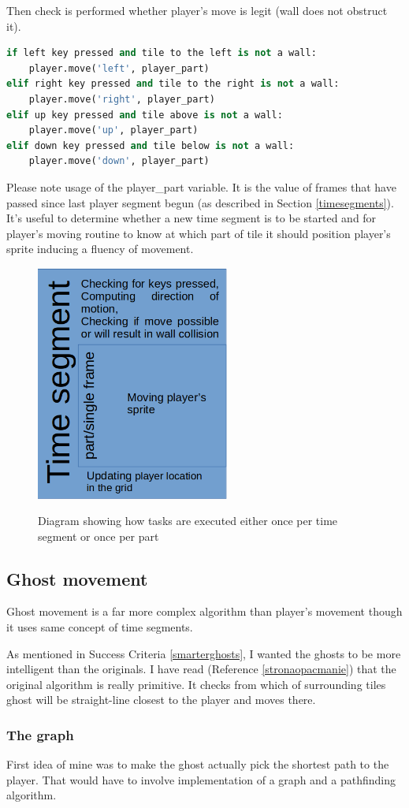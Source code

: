 \documentclass[11pt,a4paper]{report}
\newcommand{\dsubsection}[1]{\FloatBarrier \subsection{#1}}
\newenvironment{img}{
	\begin{center}
		\begin{figure}[H]
			\begin{center}
			
}{
	\end{center}
		\end{figure}
			\end{center}
}
\begin{document}
				Then check is performed whether player's move is legit (wall does not obstruct it).
				\begin{lstlisting}[language=Python]
if left key pressed and tile to the left is not a wall:
	player.move('left', player_part)
elif right key pressed and tile to the right is not a wall:
	player.move('right', player_part)
elif up key pressed and tile above is not a wall:
	player.move('up', player_part)
elif down key pressed and tile below is not a wall:
	player.move('down', player_part)
				\end{lstlisting}
				Please note usage of the player\_part variable. It is the value of frames that have passed since last player segment begun (as described in Section \ref{timesegments}). It's useful to determine whether a new time segment is to be started and for player's moving routine to know at which part of tile it should position player's sprite inducing a fluency of movement.
				\begin{img}
					\includegraphics[width=180pt]{images/movement-diagram}\\
					\caption{Diagram showing how tasks are executed either once per time segment or once per part}
					\label{player-TS}
				\end{img}
			\dsubsection{Ghost movement}
				Ghost movement is a far more complex algorithm than player's movement though it uses same concept of time segments.
				
				As mentioned in Success Criteria \ref{smarterghosts}, I wanted the ghosts to be more intelligent than the originals. I have read (Reference \ref{stronaopacmanie}) that the original algorithm is really primitive. It checks from which of surrounding tiles ghost will be straight-line closest to the player and moves there.
				\subsubsection{The graph}
					First idea of mine was to make the ghost actually pick the shortest path to the player. That would have to involve implementation of a graph and a pathfinding algorithm.
					
\end{document}
